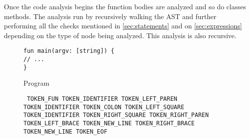 Once the code analysis begins the function bodies are analyzed and so do classes methods. The analysis run by recursively walking the AST and further performing
all the checks mentioned in \autoref{sec:statements} and on \autoref{sec:expressions} depending on the type of node being analyzed.
This analysis is also recursive.

\begin{figure}[H]
	\centering
	\begin{subtable}{0.45\textwidth}
        \texttt{fun main(argv: [string]) \{\\\tab// ...\\\}}
		\caption{Program}
	\end{subtable}
	\begin{subtable}{0.45\textwidth}
		\centering
        \texttt{
            TOKEN\_FUN TOKEN\_IDENTIFIER TOKEN\_LEFT\_PAREN TOKEN\_IDENTIFIER TOKEN\_COLON TOKEN\_LEFT\_SQUARE TOKEN\_IDENTIFIER
            TOKEN\_RIGHT\_SQUARE TOKEN\_RIGHT\_PAREN TOKEN\_LEFT\_BRACE TOKEN\_NEW\_LINE
            TOKEN\_RIGHT\_BRACE TOKEN\_NEW\_LINE
            TOKEN\_EOF
        }
		\caption{List of tokens}
	\end{subtable}
    \begin{subfigure}{0.45\textwidth}
		\centering
\end{subfigure}
\end{figure}
